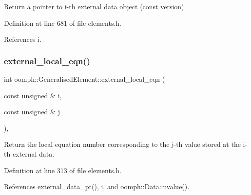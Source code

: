 Return a pointer to i-\/th external data object (const version) 



Definition at line 681 of file elements.\+h.



References i.

\mbox{\label{classoomph_1_1GeneralisedElement_ad64d0c116d24bafae79d8602012e4941}} 
\subsubsection{\texorpdfstring{external\+\_\+local\+\_\+eqn()}{external\_local\_eqn()}}
{\footnotesize\ttfamily int oomph\+::\+Generalised\+Element\+::external\+\_\+local\+\_\+eqn (\begin{DoxyParamCaption}\item[{const unsigned \&}]{i,  }\item[{const unsigned \&}]{j }\end{DoxyParamCaption})\hspace{0.3cm}{\ttfamily [inline]}, {\ttfamily [protected]}}



Return the local equation number corresponding to the j-\/th value stored at the i-\/th external data. 



Definition at line 313 of file elements.\+h.



References external\+\_\+data\+\_\+pt(), i, and oomph\+::\+Data\+::nvalue().



